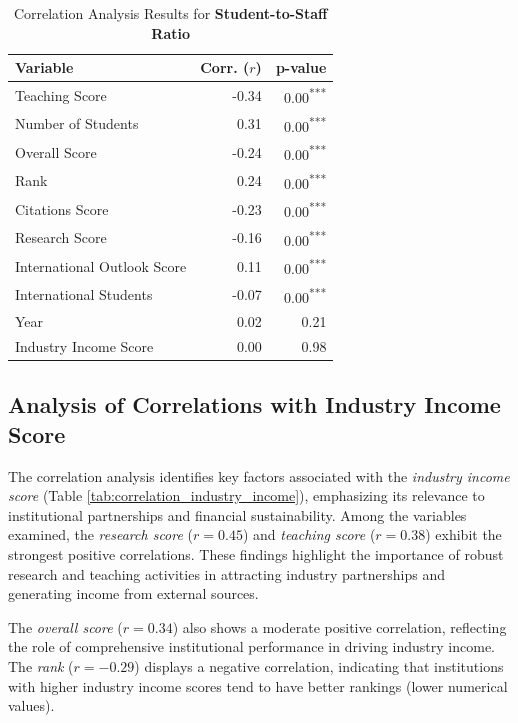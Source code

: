\documentclass[sigconf]{acmart}
\begin{document}
\begin{table}[h!]
	\centering
	\caption{Correlation Analysis Results for \textbf{Student-to-Staff Ratio}}
	\label{tab:correlation_student_staff_ratio}
	\begin{tabular}{|l|r|r|}
		\hline
		\textbf{Variable} & \textbf{Corr. ($r$)} & \textbf{p-value} \\
		\hline
		Teaching Score & -0.34 & 0.00\textsuperscript{***} \\
		Number of Students & 0.31 & 0.00\textsuperscript{***} \\
		Overall Score & -0.24 & 0.00\textsuperscript{***} \\
		Rank & 0.24 & 0.00\textsuperscript{***} \\
		Citations Score & -0.23 & 0.00\textsuperscript{***} \\
		Research Score & -0.16 & 0.00\textsuperscript{***} \\
		International Outlook Score & 0.11 & 0.00\textsuperscript{***} \\
		International Students & -0.07 & 0.00\textsuperscript{***} \\
		Year & 0.02 & 0.21 \\
		Industry Income Score & 0.00 & 0.98 \\
		\hline
	\end{tabular}
\end{table}


\subsection{Analysis of Correlations with Industry Income Score}

The correlation analysis identifies key factors associated with the \textit{industry income score} (Table \ref{tab:correlation_industry_income}), emphasizing its relevance to institutional partnerships and financial sustainability. Among the variables examined, the \textit{research score} ($r = 0.45$) and \textit{teaching score} ($r = 0.38$) exhibit the strongest positive correlations. These findings highlight the importance of robust research and teaching activities in attracting industry partnerships and generating income from external sources.

The \textit{overall score} ($r = 0.34$) also shows a moderate positive correlation, reflecting the role of comprehensive institutional performance in driving industry income. The \textit{rank} ($r = -0.29$) displays a negative correlation, indicating that institutions with higher industry income scores tend to have better rankings (lower numerical values).
\end{document}
